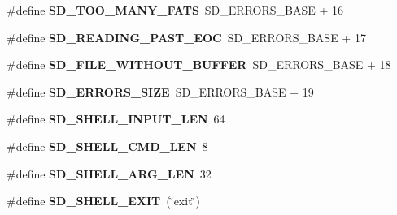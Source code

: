 \begin{DoxyCompactItemize}
\item 
\hypertarget{group__SD__Public_ga5017b3273c66c328264e9c4f565df36e}{\#define {\bfseries \-S\-D\-\_\-\-T\-O\-O\-\_\-\-M\-A\-N\-Y\-\_\-\-F\-A\-T\-S}~\-S\-D\-\_\-\-E\-R\-R\-O\-R\-S\-\_\-\-B\-A\-S\-E + 16}\label{group__SD__Public_ga5017b3273c66c328264e9c4f565df36e}

\item 
\hypertarget{group__SD__Public_ga9e554ff6dbb9ada7d94a896533f96796}{\#define {\bfseries \-S\-D\-\_\-\-R\-E\-A\-D\-I\-N\-G\-\_\-\-P\-A\-S\-T\-\_\-\-E\-O\-C}~\-S\-D\-\_\-\-E\-R\-R\-O\-R\-S\-\_\-\-B\-A\-S\-E + 17}\label{group__SD__Public_ga9e554ff6dbb9ada7d94a896533f96796}

\item 
\hypertarget{group__SD__Public_gad7281660fcc6b8fdfbc982fb2e261e8d}{\#define {\bfseries \-S\-D\-\_\-\-F\-I\-L\-E\-\_\-\-W\-I\-T\-H\-O\-U\-T\-\_\-\-B\-U\-F\-F\-E\-R}~\-S\-D\-\_\-\-E\-R\-R\-O\-R\-S\-\_\-\-B\-A\-S\-E + 18}\label{group__SD__Public_gad7281660fcc6b8fdfbc982fb2e261e8d}

\item 
\hypertarget{group__SD__Public_ga3cb8d9a3b08f02a70a48e891cc27e05b}{\#define {\bfseries \-S\-D\-\_\-\-E\-R\-R\-O\-R\-S\-\_\-\-S\-I\-Z\-E}~\-S\-D\-\_\-\-E\-R\-R\-O\-R\-S\-\_\-\-B\-A\-S\-E + 19}\label{group__SD__Public_ga3cb8d9a3b08f02a70a48e891cc27e05b}

\item 
\hypertarget{group__SD__Public_ga1fae78f046859f365629f8f0622cb6c1}{\#define {\bfseries \-S\-D\-\_\-\-S\-H\-E\-L\-L\-\_\-\-I\-N\-P\-U\-T\-\_\-\-L\-E\-N}~64}\label{group__SD__Public_ga1fae78f046859f365629f8f0622cb6c1}

\item 
\hypertarget{group__SD__Public_ga09e51228e75ddc9f72fc095a28050228}{\#define {\bfseries \-S\-D\-\_\-\-S\-H\-E\-L\-L\-\_\-\-C\-M\-D\-\_\-\-L\-E\-N}~8}\label{group__SD__Public_ga09e51228e75ddc9f72fc095a28050228}

\item 
\hypertarget{group__SD__Public_ga0aac3ed8f100622099f9d62c2a01a270}{\#define {\bfseries \-S\-D\-\_\-\-S\-H\-E\-L\-L\-\_\-\-A\-R\-G\-\_\-\-L\-E\-N}~32}\label{group__SD__Public_ga0aac3ed8f100622099f9d62c2a01a270}

\item 
\hypertarget{group__SD__Public_gafe17b4a90dc28817a4ec21ec3c570ef5}{\#define {\bfseries \-S\-D\-\_\-\-S\-H\-E\-L\-L\-\_\-\-E\-X\-I\-T}~(\char`\"{}exit\char`\"{})}\label{group__SD__Public_gafe17b4a90dc28817a4ec21ec3c570ef5}


\end{DoxyCompactItemize}
